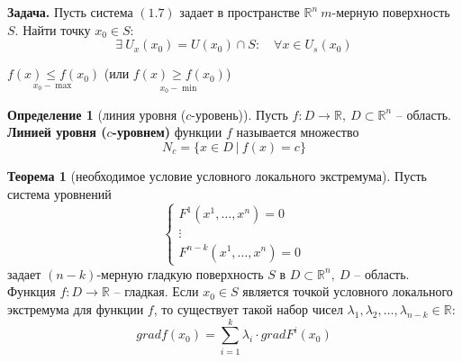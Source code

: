 \documentclass{report}
\theoremstyle{definition}
\newtheorem{definition}{Определение}[section]
\newtheorem{theorem}{Теорема}[section]
\begin{document}
\textbf{Задача.} Пусть система $(1.7)$ задает в пространстве $\mathbb{R}^n \ m$-мерную поверхность $S$. Найти точку $x_0 \in S:$
\begin{equation*}
  \exists \ U_x(x_0) = U(x_0)\cap S: \quad \forall x \in U_s(x_0)
\end{equation*}
\begin{center}
  $\underset{x_0 - \max}{f(x) \leqslant f(x_0)}$ (или $\underset{x_0 - \min}{f(x) \geqslant f(x_0)}$)
\end{center}

\begin{definition}[линия уровня ($c$-уровень)]
  Пусть $f:D\rightarrow\mathbb{R}, \ D \subset \mathbb{R}^n$ -- область. \textbf{Линией уровня ($c$-уровнем)} функции $f$ называется множество
  \begin{equation*}
    N_c = \{x\in D \ \big| \ f(x) = c\}
  \end{equation*}
\end{definition}

\begin{theorem}[необходимое условие условного локального экстремума]
  Пусть система уровнений
  \begin{equation}
    \left\{\begin{array}{l}
      F^1(x^1,\ldots,x^n) = 0 \\
      \vdots                  \\
      F^{n-k}(x^1,\ldots,x^n) = 0
    \end{array}\right.
  \end{equation}
  задает $(n-k)$-мерную гладкую поверхность $S$ в $D \subset \mathbb{R}^n, \ D$ -- область. Функция $f:D\rightarrow\mathbb{R}$ -- гладкая. Если $x_0 \in S$ является точкой условного локального экстремума для функции $f$, то существует такой набор чисел $\lambda_1,\lambda_2,\ldots,\lambda_{n-k} \in \mathbb{R}:$
  \begin{equation*}
    grad f(x_0) = \sum_{i = 1}^{k}\lambda_i \cdot grad F^i(x_0)
  \end{equation*}
\end{theorem}
\end{document}
